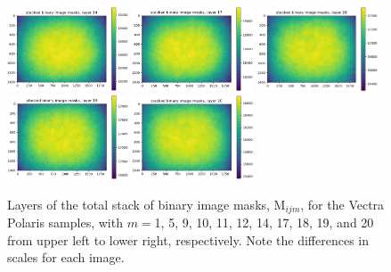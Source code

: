 \documentclass[letterpaper,11pt]{article}
\newcommand{\Mu}{\mathrm{M}}
\begin{document}
\begin{figure}[!hb]
\includegraphics[width=0.32\textwidth]{images/measuring_flatfield_corrections/mask_stack_layers_polaris/mask_stack_layer_14}
\includegraphics[width=0.32\textwidth]{images/measuring_flatfield_corrections/mask_stack_layers_polaris/mask_stack_layer_17}
\includegraphics[width=0.32\textwidth]{images/measuring_flatfield_corrections/mask_stack_layers_polaris/mask_stack_layer_18}
\includegraphics[width=0.32\textwidth]{images/measuring_flatfield_corrections/mask_stack_layers_polaris/mask_stack_layer_19}
\includegraphics[width=0.32\textwidth]{images/measuring_flatfield_corrections/mask_stack_layers_polaris/mask_stack_layer_20}
\caption{\footnotesize Layers of the total stack of binary image masks, $\Mu_{ijm}$, for the Vectra Polaris samples, with $m=$1, 5, 9, 10, 11, 12, 14, 17, 18, 19, and 20 from upper left to lower right, respectively. Note the differences in scales for each image.}
\label{fig:mask_stack_layers_polaris_1}
\end{figure}
\end{document}

